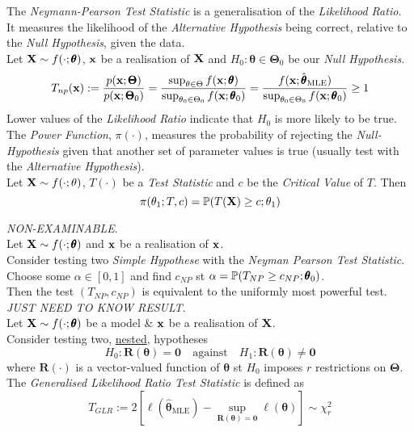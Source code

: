\documentclass[11pt,a4paper]{article}
\begin{document}
The \textit{Neymann-Pearson Test Statistic} is a generalisation of the \textit{Likelihood Ratio}.\\
It measures the likelihood of the \textit{Alternative Hypothesis} being correct, relative to the \textit{Null Hypothesis}, given the data.\\
Let $\textbf{X}\sim f(\cdot;\pmb\theta)$, $\textbf{x}$ be a realisation of $\textbf{X}$ and $H_0:\pmb\theta\in\pmb\Theta_0$ be our \textit{Null Hypothesis}.
$$T_{np}(\textbf{x}):=\dfrac{p(\textbf{x};\pmb\Theta)}{p(\textbf{x};\pmb\Theta_0)}=\dfrac{\sup_{\theta\in\Theta} f(\textbf{x};\pmb\theta)}{\sup_{\theta_0\in\Theta_0}f(\textbf{x};\pmb\theta_0)}=\dfrac{f(\textbf{x};\hat{\pmb\theta}_\text{MLE})}{\sup_{\theta_0\in\Theta_0}f(\textbf{x};\pmb\theta_0)}\geq1$$
Lower values of the \textit{Likelihood Ratio} indicate that $H_0$ is more likely to be true.\\

The \textit{Power Function}, $\pi(\cdot)$, measures the probability of rejecting the \textit{Null-Hypothesis} given that another set of parameter values is true (usually test with the \textit{Alternative Hypothesis}).\\
Let $\textbf{X}\sim f(\cdot;\theta)$, $T(\cdot)$ be a \textit{Test Statistic} and $c$ be the \textit{Critical Value} of $T$. Then
$$\pi(\theta_1;T,c)=\mathbb{P}(T(\textbf{X})\geq c;\theta_1)$$

\textit{NON-EXAMINABLE}.\\
Let $\textbf{X}\sim f(\cdot;\pmb\theta)$ and $\textbf{x}$ be a realisation of $\textbf{x}$.\\
Consider testing two \textit{Simple Hypothese} with the \textit{Neyman Pearson Test Statistic}.\\
Choose some $\alpha\in[0,1]$ and find $c_{NP}$ st $\alpha=\mathbb{P}(T_{NP}\geq c_{NP};\pmb\theta_0)$.\\
Then the test $(T_{NP},c_{NP})$ is equivalent to the uniformly most powerful test.\\

\textit{JUST NEED TO KNOW RESULT}.\\
Let $\textbf{X}\sim f(\cdot;\pmb\theta)$ be a model \& $\textbf{x}$ be a realisation of $\textbf{X}$.\\
Consider testing two, \underline{nested}, hypotheses
$$H_0:\textbf{R}(\pmb\theta)=\pmb0\quad\text{against}\quad H_1:\textbf{R}(\pmb\theta)\neq\pmb0$$
where $\textbf{R}(\cdot)$ is a vector-valued function of $\pmb\theta$ st $H_0$ imposes $r$ restrictions on $\pmb\Theta$.\\
The \textit{Generalised Likelihood Ratio Test Statistic} is defined as
$$T_{GLR}:=2[\ell(\hat{\pmb\theta}_\text{MLE})-\sup_{\textbf{R}(\pmb\theta)=\pmb0}\ell(\pmb\theta)]\sim\chi^2_r$$
\end{document}
